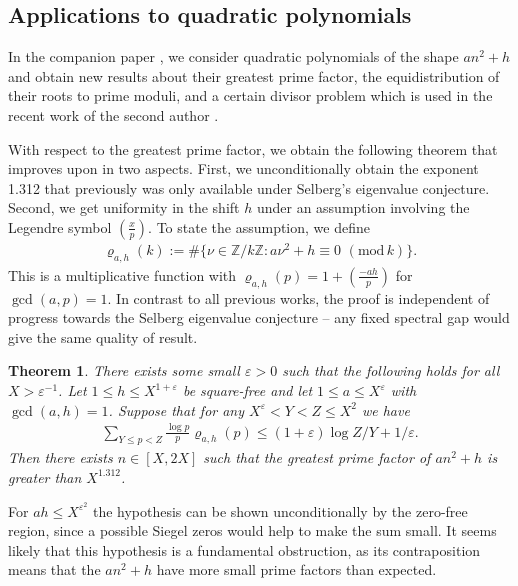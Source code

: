 \documentclass[12pt]{amsart}
\newtheorem{theorem}{Theorem}[section]
\theoremstyle{definition}
\theoremstyle{remark}
\numberwithin{equation}{section}
\newcommand{\Z}{{\mathbb Z}}
\newcommand{\1}{{\mathbf 1}}
\newcommand{\eps}{\varepsilon}
\renewcommand{\pmod}[1]{\,\,(\mathrm{mod}\,{#1})}
\begin{document}
\subsection{Applications to quadratic polynomials} \label{sec:applications}
In the companion paper \cite{GMquadratic}, we consider quadratic polynomials of the shape $an^2+h$ and obtain new results about their greatest prime factor, the equidistribution of their roots to prime moduli, and a certain divisor problem which is used in the recent work of the second author \cite{mx2y3}. 

With respect to the greatest prime factor, we obtain the following theorem that improves upon \cite{mlargepf,pascadi2024large} in two aspects. First, we unconditionally obtain the exponent 1.312 that previously was only available under Selberg's eigenvalue conjecture.  Second, we get uniformity in the shift $h$ under an assumption involving the Legendre symbol $(\tfrac{x}{p})$. To state the assumption, we define
\begin{align*}
  \varrho_{a,h}(k):= \#\{ \nu \in \Z/k\Z: a\nu^2+h \equiv 0 \pmod{k} \}.
\end{align*}
This is a multiplicative function with $ \varrho_{a,h}(p) = 1 + (\frac{-ah}{p})$ for $\gcd(a,p)=1$. In contrast to all previous works, the proof is independent of progress towards the Selberg eigenvalue conjecture -- any fixed spectral gap would give the same quality of result.
\begin{theorem}\label{thm:primefactor}
There exists some small $\eps >0$ such that the following holds for all $X > \eps^{-1}$. Let $1 \leq h\leq X^{1+\eps}$ be square-free and let $1 \leq a\leq X^{\eps}$ with $\gcd(a,h)=1$. Suppose that for any $X^{\eps}<  Y < Z \leq X^2$ we have
\begin{align*}
  \sum_{Y \leq p < Z} \frac{\log p}{p} \varrho_{a,h}(p)\leq (1+\eps) \log Z/Y + 1/\eps.
\end{align*}
 Then there exists $n\in [X,2X]$ such that the greatest prime factor of $a n^2+h$ is greater than $X^{1.312}$.  
\end{theorem}
For $ah \leq X^{\eps^2}$ the hypothesis can be shown unconditionally by the zero-free region, since a possible Siegel zeros would help to make the sum small. It seems likely that this hypothesis is a fundamental obstruction, as its contraposition means that the $an^2+h$ have more  small prime factors than expected. 
 
\end{document}
